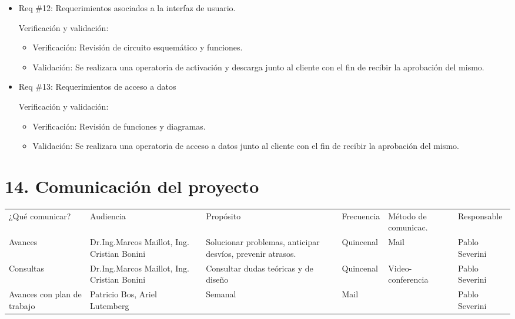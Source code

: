 \documentclass[11pt]{charter}
\begin{document}
\begin{itemize}
\item Req \#12: Requerimientos asociados a la interfaz de usuario.

Verificación y validación:

\begin{itemize}
\item Verificación: Revisión de circuito esquemático y funciones.
\item Validación: Se realizara una operatoria de activación y descarga junto al cliente con el fin de recibir la aprobación del mismo.
\end{itemize}

\item Req \#13: Requerimientos de acceso a datos

Verificación y validación:

\begin{itemize}
\item Verificación: Revisión de funciones y diagramas.
\item Validación: Se realizara una operatoria de acceso a datos junto al cliente con el fin de recibir la aprobación del mismo. 
\end{itemize}

\end{itemize}


\section{14. Comunicación del proyecto}
\label{sec:comunicaciones}

\begin{table}[H]
\centering
\begin{tabularx}{\linewidth}{@{}|X|X|X|X|X|X|@{}}
\hline
\rowcolor[HTML]{C0C0C0} 
\multicolumn{6}{|c|}{\cellcolor[HTML]{C0C0C0}PLAN DE COMUNICACIÓN DEL PROYECTO}           \\ \hline
\rowcolor[HTML]{C0C0C0} 
¿Qué comunicar? & Audiencia & Propósito & Frecuencia & Método de comunicac. & Responsable \\ \hline
Avances         & Dr.Ing.Marcos Maillot, Ing. Cristian Bonini & Solucionar problemas, anticipar desvíos, prevenir atrasos.          & Quincenal  & Mail			        & Pablo Severini            \\ \hline
Consultas       & Dr.Ing.Marcos Maillot, Ing. Cristian Bonini & Consultar dudas teóricas y de diseño  
& Quincenal  	& Video-conferencia     & Pablo Severini            \\ \hline
Avances con plan de trabajo         & Patricio Bos, Ariel Lutemberg  &      Semanal     &  Mail          &                      & Pablo Severini            \\ \hline
\end{tabularx}
\end{table}
\pagebreak
\end{document}
